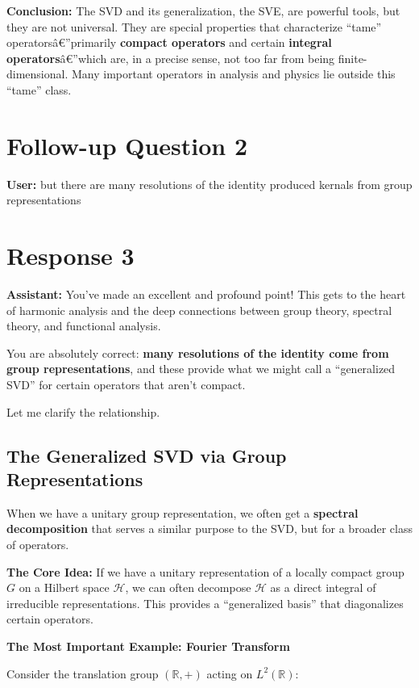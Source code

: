\documentclass[aps,prl,reprint]{revtex4-2}
\begin{document}
\textbf{Conclusion:} The SVD and its generalization, the SVE, are powerful
tools, but they are not universal. They are special properties that
characterize ``tame'' operators\^{a}\euro ''primarily \textbf{compact
operators} and certain \textbf{integral operators}\^{a}\euro ''which are, in
a precise sense, not too far from being finite-dimensional. Many important
operators in analysis and physics lie outside this ``tame'' class.

\section*{Follow-up Question 2}

\textbf{User:} but there are many resolutions of the identity produced
kernals from group representations

\section*{Response 3}

\textbf{Assistant:} You've made an excellent and profound point! This gets
to the heart of harmonic analysis and the deep connections between group
theory, spectral theory, and functional analysis.

You are absolutely correct: \textbf{many resolutions of the identity come
from group representations}, and these provide what we might call a
``generalized SVD'' for certain operators that aren't compact.

Let me clarify the relationship.

\subsection*{The Generalized SVD via Group Representations}

When we have a unitary group representation, we often get a \textbf{spectral
decomposition} that serves a similar purpose to the SVD, but for a broader
class of operators.

\textbf{The Core Idea:} If we have a unitary representation of a locally
compact group $G$ on a Hilbert space $\mathcal{H}$, we can often decompose $%
\mathcal{H}$ as a direct integral of irreducible representations. This
provides a ``generalized basis'' that diagonalizes certain operators.

\textbf{The Most Important Example: Fourier Transform}

Consider the translation group $(\mathbb{R}, +)$ acting on $L^2(\mathbb{R})$:
\end{document}
